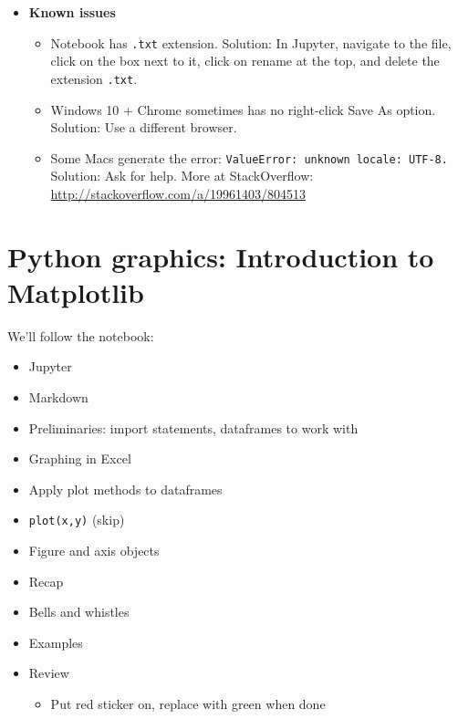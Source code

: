 \documentclass[11pt]{article}
\begin{document}
\begin{itemize}
\item {\bf Known issues}
\begin{itemize}
\item Notebook has {\tt .txt} extension.  Solution:  In Jupyter, navigate to the file, 
click on the box next to it, click on rename at the top, and delete the extension 
{\tt .txt}.  
\item Windows 10 + Chrome sometimes has no right-click Save As option.
Solution:  Use a different browser.
\item Some Macs generate the error:  {\tt ValueError: unknown locale: UTF-8.} 
Solution:  Ask for help. More at StackOverflow: 
\url{http://stackoverflow.com/a/19961403/804513}

\end{itemize}
\end{itemize}


\section*{Python graphics:  Introduction to Matplotlib}

We'll follow the notebook:
\begin{itemize}
\item Jupyter
\item Markdown
\item Preliminaries:  import statements, dataframes to work with
\item Graphing in Excel
\item Apply plot methods to dataframes
\item {\tt plot(x,y)} (skip)
\item Figure and axis objects
\item Recap
\item Bells and whistles
\item Examples
\item Review
\begin{itemize}
\item Put red sticker on, replace with green when done
\end{itemize}
\end{itemize}


\begin{comment}
\section*{Examples}

If time permits, we'll go through some examples of economic and financial data
and its properties.  It's an IPython notebook that you can view on the GitHub repo:
the \verb|Code/IPython| directory,
file \verb|bootcamp_examples.ipynb|.
\end{comment}
\end{document}
